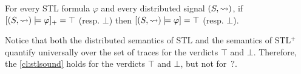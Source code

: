 \begin{theorem} \label{cl:stlsound}
	For every STL formula $\varphi$ and every distributed signal $(S,{\rightsquigarrow})$, if $[(S,{\rightsquigarrow}) \models \varphi]_+ = \top$ (resp. $\bot$) then $[(S,{\rightsquigarrow}) \models \varphi] = \top$ (resp. $\bot$).
\end{theorem}

Notice that both the distributed semantics of STL and the semantics of STL$^+$ quantify universally over the set of traces for the verdicts $\top$ and $\bot$.
Therefore, the \cref{cl:stlsound} holds for the verdicts $\top$ and $\bot$, but not for ${\,?}$.

